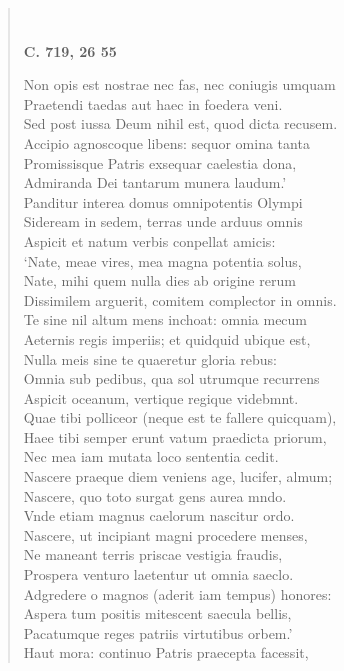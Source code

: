 \documentclass[11pt, a4paper]{report}
\begin{document}
\begin{verse}
        ﻿\pagebreak 
     \marginpar{[186]} \begin{center} \textbf{C. 719, 26 55} \end{center}Non opis est nostrae nec fas, nec coniugis umquam \\ Praetendi taedas aut haec in foedera veni. \\ Sed post iussa Deum nihil est, quod dicta recusem. \\ Accipio agnoscoque libens: sequor omina tanta \\ Promissisque Patris exsequar caelestia dona, \\ Admiranda Dei tantarum munera laudum.’ \\ Panditur interea domus omnipotentis Olympi \\ Sideream in sedem, terras unde arduus omnis \\ Aspicit et natum verbis conpellat amicis: \\ ‘Nate, meae vires, mea magna potentia solus, \\ Nate, mihi quem nulla dies ab origine rerum \\ Dissimilem arguerit, comitem complector in omnis. \\ Te sine nil altum mens inchoat: omnia mecum \\ Aeternis regis imperiis; et quidquid ubique est, \\ Nulla meis sine te quaeretur gloria rebus: \\ Omnia sub pedibus, qua sol utrumque recurrens \\ Aspicit oceanum, vertique regique videbmnt. \\ Quae tibi polliceor (neque est te fallere quicquam), \\ Haee tibi semper erunt vatum praedicta priorum, \\ Nec mea iam mutata loco sententia cedit. \\ Nascere praeque diem veniens age, lucifer, almum; \\ Nascere, quo toto surgat gens aurea mndo. \\ Vnde etiam magnus caelorum nascitur ordo. \\ Nascere, ut incipiant magni procedere menses, \\ Ne maneant terris priscae vestigia fraudis, \\ Prospera venturo laetentur ut omnia saeclo. \\ Adgredere o magnos (aderit iam tempus) honores: \\ Aspera tum positis mitescent saecula bellis, \\ Pacatumque reges patriis virtutibus orbem.’ \\ Haut mora: continuo Patris praecepta facessit, \\ 

\end{verse}
\end{document}
